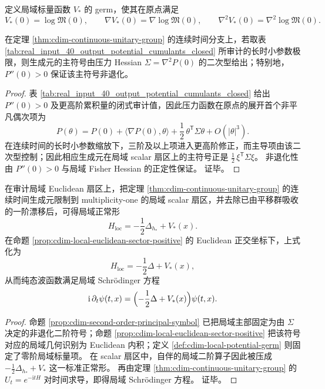 \begin{definition}\label{def:cdim-local-potential-germ}
定义局域标量函数 \(V_\ast\) 的 germ，使其在原点满足
\[
V_\ast(0)=\log\mathfrak M(0),\qquad
\nabla V_\ast(0)=\nabla\log\mathfrak M(0),\qquad
\nabla^2V_\ast(0)=\nabla^2\log\mathfrak M(0).
\]
\end{definition}

\begin{proposition}[连续极限的二阶主符号]\label{prop:cdim-second-order-principal-symbol}
在定理 \ref{thm:cdim-continuous-unitary-group} 的连续时间分支上，若取表 \ref{tab:real_input_40_output_potential_cumulants_closed} 所审计的长时小参数极限，则生成元的主符号由压力 Hessian \(\Sigma=\nabla^2P(0)\) 的二次型给出；特别地，\(P''(0)>0\) 保证该主符号非退化。
\end{proposition}
\begin{proof}
表 \ref{tab:real_input_40_output_potential_cumulants_closed} 给出 \(P''(0)>0\) 及更高阶累积量的闭式审计值，因此压力函数在原点的展开首个非平凡偶次项为
\[
P(\theta)=P(0)+\langle\nabla P(0),\theta\rangle+\frac12\,\theta^{\mathsf T}\Sigma\theta+O(|\theta|^3).
\]
在连续时间的长时小参数缩放下，三阶及以上项进入更高阶修正，而主导项由该二次型控制；因此相应生成元在局域 scalar 扇区上的主符号正是 \(\frac12\,\xi^{\mathsf T}\Sigma\xi\)。
非退化性由 \(P''(0)>0\) 与局域 Fisher Hessian 的正定性保证。
证毕。
\end{proof}

\begin{theorem}\label{thm:cdim-local-schrodinger-sector}
在审计局域 Euclidean 扇区上，把定理 \ref{thm:cdim-continuous-unitary-group} 的连续时间生成元限制到 multiplicity-one 的局域 scalar 扇区，并去除已由平移群吸收的一阶漂移后，可得局域正常形
\[
H_{\mathrm{loc}}
=
-\frac12\Delta_{h_\ast}+V_\ast(x).
\]
在命题 \ref{prop:cdim-local-euclidean-sector-positive} 的 Euclidean 正交坐标下，上式化为
\[
H_{\mathrm{loc}}
=
-\frac12\Delta+V_\ast(x),
\]
从而纯态波函数满足局域 Schr\"odinger 方程
\[
\mathrm i\,\partial_t\psi(t,x)
=
\Bigl(-\frac12\Delta+V_\ast(x)\Bigr)\psi(t,x).
\]
\end{theorem}
\begin{proof}
命题 \ref{prop:cdim-second-order-principal-symbol} 已把局域主部固定为由 \(\Sigma\) 决定的非退化二阶符号；命题 \ref{prop:cdim-local-euclidean-sector-positive} 把该符号对应的局域几何识别为 Euclidean 内积；定义 \ref{def:cdim-local-potential-germ} 则固定了零阶局域标量项。
在 scalar 扇区中，自伴的局域二阶算子因此被压成
\(
-\frac12\Delta_{h_\ast}+V_\ast
\)
这一标准正常形。
再由定理 \ref{thm:cdim-continuous-unitary-group} 的 \(U_t=e^{-\mathrm itH}\) 对时间求导，即得局域 Schr\"odinger 方程。
证毕。
\end{proof}

